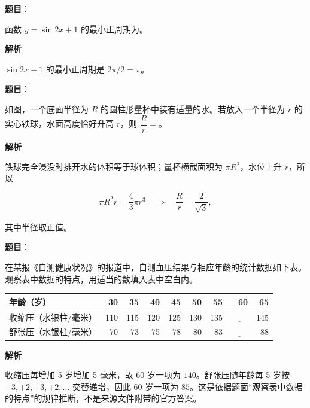 \begin{answer}

\textbf{题目}：

函数 $y=\sin 2x+1$ 的最小正周期为\underline{\qquad}。

\textbf{解析}

$\sin 2x+1$ 的最小正周期是 $2\pi/2=\pi$。


\end{answer}
\begin{answer}

\textbf{题目}：

如图，一个底面半径为 $R$ 的圆柱形量杯中装有适量的水。若放入一个半径为 $r$ 的实心铁球，水面高度恰好升高 $r$，则 $\dfrac Rr=$\underline{\qquad}。
\nopagebreak[4]
\begin{center}\end{center}
\nopagebreak[4]
\textbf{解析}

铁球完全浸没时排开水的体积等于球体积；量杯横截面积为 $\pi R^2$，水位上升 $r$，所以

\nopagebreak[4]
\[
\pi R^2r=\frac43\pi r^3
\quad\Longrightarrow\quad
\frac Rr=\frac{2}{\sqrt3},
\]

其中半径取正值。


\end{answer}
\begin{answer}

\textbf{题目}：

在某报《自测健康状况》的报道中，自测血压结果与相应年龄的统计数据如下表。观察表中数据的特点，用适当的数填入表中空白内。

\begin{center}
\begingroup\setlength{\tabcolsep}{4pt}
\begin{tabular}{lrrrrrrrr}
\toprule
年龄（岁） & 30 & 35 & 40 & 45 & 50 & 55 & 60 & 65 \\
\midrule
收缩压（水银柱/毫米） & 110 & 115 & 120 & 125 & 130 & 135 & $\underline{\qquad}$ & 145 \\
舒张压（水银柱/毫米） & 70 & 73 & 75 & 78 & 80 & 83 & $\underline{\qquad}$ & 88 \\
\bottomrule
\end{tabular}
\endgroup
\end{center}

\textbf{解析}

收缩压每增加 5 岁增加 5 毫米，故 60 岁一项为 $140$。舒张压随年龄每 5 岁按 $+3,+2,+3,+2,\ldots$ 交替递增，因此 60 岁一项为 $85$。这是依据题面“观察表中数据的特点”的规律推断，不是来源文件附带的官方答案。


\end{answer}
